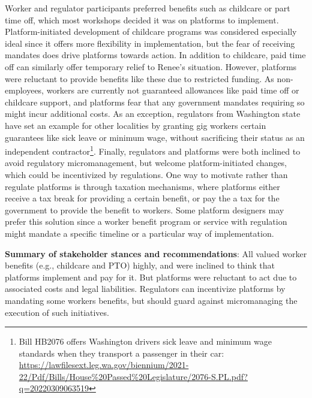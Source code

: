 Worker and regulator participants preferred benefits such as childcare or part time off, which most workshops decided it was on platforms to implement. 
Platform-initiated development of childcare programs was considered especially ideal since it offers more flexibility in implementation, but the fear of receiving mandates does drive platforms towards action. In addition to childcare, paid time off can similarly offer temporary relief to Renee's situation. However, platforms were reluctant to provide benefits like these due to restricted funding. As non-employees, workers are currently not guaranteed allowances like paid time off or childcare support, and platforms fear that any government mandates requiring so might incur additional costs.
As an exception, regulators from Washington state have set an example for other localities by granting gig workers certain guarantees like sick leave or minimum wage, without sacrificing their status as an independent contractor\footnote{Bill HB2076 offers Washington drivers sick leave and minimum wage standards when they transport a passenger in their car: \url{https://lawfilesext.leg.wa.gov/biennium/2021-22/Pdf/Bills/House\%20Passed\%20Legislature/2076-S.PL.pdf?q=20220309063519}}. Finally, regulators and platforms were both inclined to avoid regulatory micromanagement, but welcome platform-initiated changes, which could be incentivized by regulations. One way to motivate rather than regulate platforms is through taxation mechanisms, where platforms either receive a tax break for providing a certain benefit, or pay the a tax for the government to provide the benefit to workers. Some platform designers may prefer this solution since a worker benefit program or service with regulation might mandate a specific timeline or a particular way of implementation.

\textbf{Summary of stakeholder stances and recommendations}: All valued worker benefits (e.g., childcare and PTO) highly, and were inclined to think that platforms implement and pay for it. But platforms were reluctant to act due to associated costs and legal liabilities. Regulators can incentivize platforms by mandating some workers benefits, but should guard against micromanaging the execution of such initiatives.


\FloatBarrier

